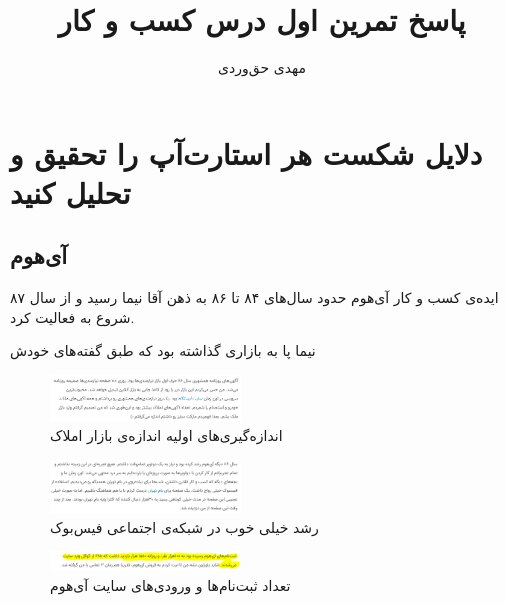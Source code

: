 \documentclass[dvipsnames, svgnames, x11names, 11pt, twocolumn]{article}
\title{پاسخ تمرین اول درس کسب و کار}
\author{مهدی حق‌وردی}
\date{}
\begin{document}
\maketitle
\tableofcontents

\section{دلایل شکست هر استارت‌آپ را تحقیق و تحلیل کنید}
\subsection{آی‌هوم}
ایده‌ی کسب و کار آی‌هوم
حدود سال‌های ۸۴ تا ۸۶ به ذهن آقا نیما 
رسید و از سال ۸۷ شروع به فعالیت کرد.

نیما پا به بازاری گذاشته بود که طبق گفته‌های خودش
\begin{figure}[H]
\begin{center}
\includegraphics[width=0.45\textwidth, height=0.08\textheight]{images/market-size}
\caption{اندازه‌گیری‌های اولیه اندازه‌ی بازار املاک}
\end{center}
\end{figure}

\begin{figure}[H]
\begin{center}
\includegraphics[width=0.45\textwidth, height=0.08\textheight]{images/ms-2}
\caption{رشد خیلی خوب در شبکه‌ی اجتماعی فیس‌بوک}
\end{center}
\end{figure}

\begin{figure}[H]
\begin{center}
\includegraphics[width=0.45\textwidth, height=0.04\textheight]{images/ms-3}
\caption{تعداد ثبت‌نام‌ها و ورودی‌های سایت آی‌هوم}
\end{center}
\end{figure}
\end{document}
